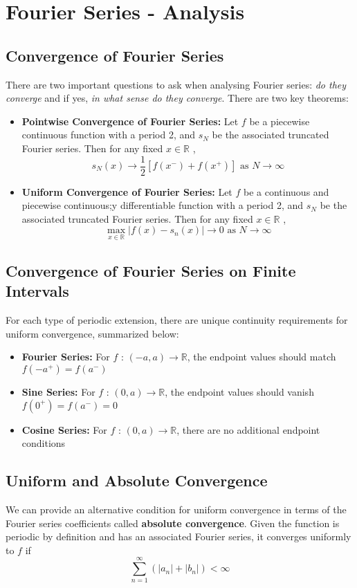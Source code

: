 \documentclass[11pt]{article}
\newcommand{\R}{\mathbb{R}}
\begin{document}
\section{Fourier Series - Analysis}

\subsection{Convergence of Fourier Series}
There are two important questions to ask when analysing Fourier series: \textit{do they converge} and if yes, \textit{in what sense do they converge}. There are two key theorems:
\begin{itemize}
\item \textbf{Pointwise Convergence of Fourier Series:} Let $f$ be a piecewise continuous function
with a period 2, and $s_N$ be the associated truncated Fourier series. Then for any fixed $x \in \R$ ,
$$ s_N(x) \rightarrow \frac{1}{2} \left[ f(x^-)+f(x^+)\right] \text{  as  } N \rightarrow \infty$$
\item \textbf{Uniform Convergence of Fourier Series:} Let $f$ be a continuous and piecewise continuous;y differentiable function
with a period 2, and $s_N$ be the associated truncated Fourier series. Then for any fixed $x \in \R$ ,
$$ \max_{x \in \R} |f(x) - s_n(x)| \rightarrow 0 \text{  as  } N \rightarrow \infty$$
\end{itemize}
\subsection{Convergence of Fourier Series on Finite Intervals}
For each type of periodic extension, there are unique continuity requirements for uniform convergence, summarized below:
\begin{itemize}
\item \textbf{Fourier Series:} For $f$ : $(-a,a)\rightarrow \R$, the endpoint values should match $f(-a^+) = f(a^-)$
\item \textbf{Sine Series:} For $f$ : $(0,a)\rightarrow \R$, the endpoint values should vanish $f(0^+) = f(a^-)=0$
\item \textbf{Cosine Series:} For $f$ : $(0,a)\rightarrow \R$, there are no additional endpoint conditions
\end{itemize}
\subsection{Uniform and Absolute Convergence}
We can provide an alternative condition for uniform convergence in terms of the Fourier series coefficients called \textbf{absolute convergence}. Given the function is periodic by definition and has an associated Fourier series, it converges uniformly to $f$ if
$$ \sum_{n=1}^{\infty} \left( |a_n| + |b_n| \right) < \infty $$
\end{document}
